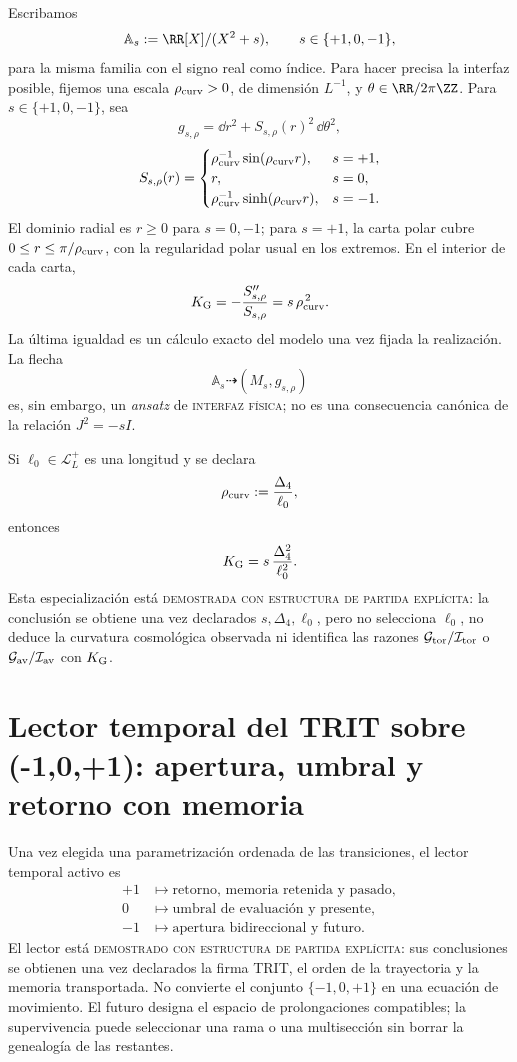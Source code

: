 Escribamos
\[
 \mathbb A_s:=\RR[X]/(X^2+s),
 \qquad s\in\{+1,0,-1\},
\]
para la misma familia con el signo real como índice.
Para hacer precisa la interfaz posible, fijemos una escala
\(\rho_{\rm curv}>0\), de dimensión \(L^{-1}\), y
\(\theta\in\RR/2\pi\ZZ\). Para \(s\in\{+1,0,-1\}\), sea
\[
 g_{s,\rho}
 =\dd r^2+S_{s,\rho}(r)^2\,\dd\theta^2,
\]
\[
 S_{s,\rho}(r)=
 \begin{cases}
  \rho_{\rm curv}^{-1}\sin(\rho_{\rm curv}r),&s=+1,\\
  r,&s=0,\\
  \rho_{\rm curv}^{-1}\sinh(\rho_{\rm curv}r),&s=-1.
 \end{cases}
\]
El dominio radial es \(r\geq0\) para \(s=0,-1\); para \(s=+1\), la carta
polar cubre \(0\leq r\leq\pi/\rho_{\rm curv}\), con la regularidad polar
usual en los extremos. En el interior de cada carta,
\[
 K_{\rm G}
 =-\frac{S_{s,\rho}''}{S_{s,\rho}}
 =s\,\rho_{\rm curv}^{\,2}.
\]
La última igualdad es un cálculo exacto del modelo una vez fijada la
realización. La flecha
\[
 \mathbb A_s\dashrightarrow(M_s,g_{s,\rho})
\]
es, sin embargo, un \emph{ansatz} de \textsc{interfaz física}; no es una
consecuencia canónica de la relación \(J^2=-sI\).

Si \(\ell_0\in\mathcal L_L^+\) es una longitud y se declara
\[
 \rho_{\rm curv}:=\frac{\Delta_4}{\ell_0},
\]
entonces
\[
 K_{\rm G}
 =s\,\frac{\Delta_4^2}{\ell_0^2}.
\]
Esta especialización está
\textsc{demostrada con estructura de partida explícita}: la conclusión se
obtiene una vez declarados \(s,\Delta_4,\ell_0\), pero no selecciona
\(\ell_0\), no
deduce la curvatura cosmológica observada ni identifica las razones
\(\mathcal G_{\rm tor}/\mathcal I_{\rm tor}\) o
\(\mathcal G_{\rm av}/\mathcal I_{\rm av}\) con \(K_{\rm G}\).

\section{Lector temporal del TRIT sobre ({-1,0,+1}): apertura, umbral y retorno con memoria}
\label{sec:lector-temporal-trit}

Una vez elegida una parametrización ordenada de las transiciones, el lector
temporal activo es
\[
\begin{aligned}
 +1&\longmapsto
 \text{retorno, memoria retenida y pasado},\\
 0&\longmapsto
 \text{umbral de evaluación y presente},\\
 -1&\longmapsto
 \text{apertura bidireccional y futuro}.
\end{aligned}
\]
El lector está \textsc{demostrado con estructura de partida explícita}: sus
conclusiones se obtienen una vez declarados la firma TRIT, el orden de la
trayectoria y la memoria transportada. No convierte el conjunto
\(\{-1,0,+1\}\) en una ecuación de movimiento. El futuro designa el espacio
de prolongaciones compatibles; la supervivencia puede seleccionar una rama
o una multisección sin borrar la genealogía de las restantes.

